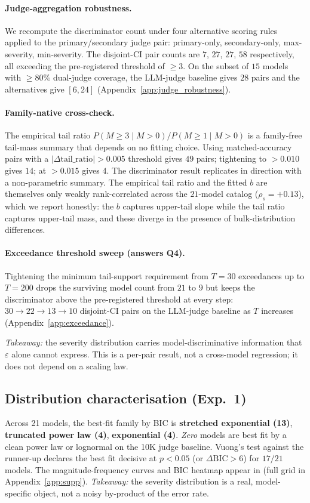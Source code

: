 \documentclass{article}
\newcommand{\sdi}{\ensuremath{b}}
\begin{document}
\paragraph{Judge-aggregation robustness.} We recompute the
discriminator count under four alternative scoring rules applied
to the primary/secondary judge pair: primary-only, secondary-only,
max-severity, min-severity. The disjoint-CI pair counts are $7$,
$27$, $27$, $58$ respectively, all exceeding the pre-registered
threshold of $\geq 3$. On the subset of $15$ models with
$\geq 80\%$ dual-judge coverage, the LLM-judge baseline gives $28$
pairs and the alternatives give $[6, 24]$
(Appendix~\ref{app:judge_robustness}).

\paragraph{Family-native cross-check.} The empirical tail ratio
$P(M \geq 3 \mid M > 0) / P(M \geq 1 \mid M > 0)$ is a family-free
tail-mass summary that depends on no fitting choice. Using
matched-accuracy pairs with a $|\Delta\text{tail\_ratio}| > 0.005$
threshold gives $49$ pairs; tightening to $> 0.010$ gives $14$; at
$> 0.015$ gives $4$. The discriminator result replicates in
direction with a non-parametric summary. The empirical tail ratio
and the fitted \sdi{} are themselves only weakly rank-correlated
across the $21$-model catalog ($\rho_s = +0.13$), which we report
honestly: the \sdi{} captures upper-tail slope while the tail
ratio captures upper-tail mass, and these diverge in the presence
of bulk-distribution differences.

\paragraph{Exceedance threshold sweep (answers Q4).} Tightening
the minimum tail-support requirement from $T = 30$ exceedances up
to $T = 200$ drops the surviving model count from $21$ to $9$ but
keeps the discriminator above the pre-registered threshold at every
step: $30 \to 22 \to 13 \to 10$ disjoint-CI pairs on the LLM-judge
baseline as $T$ increases (Appendix~\ref{app:exceedance}).

\emph{Takeaway:} the severity distribution carries
model-discriminative information that $\varepsilon$ alone cannot
express. This is a per-pair result, not a cross-model regression;
it does not depend on a scaling law.

\subsection{Distribution characterisation (Exp.\ 1)}\label{sec:exp1}
Across 21 models, the best-fit family by BIC is
\textbf{stretched exponential (13)}, \textbf{truncated power law (4)},
\textbf{exponential (4)}. \emph{Zero} models are best fit by a clean
power law or lognormal on the 10K judge baseline. Vuong's test against
the runner-up declares the best fit decisive at $p < 0.05$ (or
$\Delta\text{BIC} > 6$) for $17/21$ models. The magnitude-frequency
curves and BIC heatmap appear in  (full grid in
Appendix~\ref{app:supp}). \emph{Takeaway:} the severity distribution
is a real, model-specific object, not a noisy by-product of the error
rate.
\end{document}

